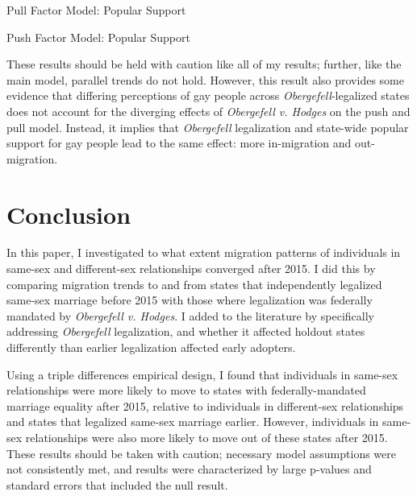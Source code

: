 \documentclass[12pt,letterpaper]{article}
\begin{document}
\begin{table}[htbp] %
    \centering
    \caption{Pull Factor Model: Popular Support}
    \label{tab: popsupport_expost_model}
    
\end{table}
\begin{table}[htbp]
    \centering
    \caption{Push Factor Model: Popular Support}
    \label{tab: popsupport_exante_model}
    
\end{table}

These results should be held with caution like all of my results; further, like the main model, parallel trends do not hold. However, this result also provides some evidence that differing perceptions of gay people across \textit{Obergefell}-legalized states does not account for the diverging effects of \textit{Obergefell v. Hodges} on the push and pull model. Instead, it implies that \textit{Obergefell} legalization and state-wide popular support for gay people lead to the same effect: more in-migration and out-migration.

\FloatBarrier %
\section{Conclusion}

In this paper, I investigated to what extent migration patterns of individuals in same-sex and different-sex relationships converged after 2015. I did this by comparing migration trends to and from states that independently legalized same-sex marriage before 2015 with those where legalization was federally mandated by \textit{Obergefell v. Hodges}. I added to the literature by specifically addressing \textit{Obergefell} legalization, and whether it affected holdout states differently than earlier legalization affected early adopters.

Using a triple differences empirical design, I found that individuals in same-sex relationships were more likely to move to states with federally-mandated marriage equality after 2015, relative to individuals in different-sex relationships and states that legalized same-sex marriage earlier. However, individuals in same-sex relationships were also more likely to move out of these states after 2015. These results should be taken with caution; necessary model assumptions were not consistently met, and results were characterized by large p-values and standard errors that included the null result.
\end{document}
